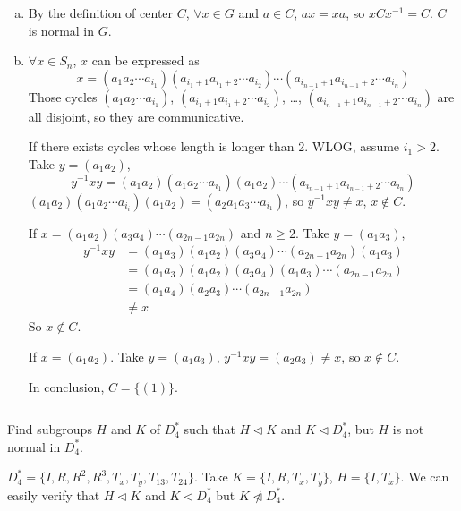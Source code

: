 \begin{answer}
    \begin{enumerate}[(a)]
        \item By the definition of center $C$, $\forall x\in G$ and $a\in C$, $ax=xa$, so $xCx^{-1}=C$. $C$ is normal in $G$.
        \item $\forall x\in S_{n}$, $x$ can be expressed as \[x=(a_{1}a_{2}\cdots a_{i_{1}})(a_{i_{1}+1}a_{i_{1}+2}\cdots a_{i_{2}})\cdots(a_{i_{n-1}+1}a_{i_{n-1}+2}\cdots a_{i_{n}})\]
        Those cycles $(a_{1}a_{2}\cdots a_{i_{1}})$, $(a_{i_{1}+1}a_{i_{1}+2}\cdots a_{i_{2}})$, \dots, $(a_{i_{n-1}+1}a_{i_{n-1}+2}\cdots a_{i_{n}})$ are all disjoint, so they are communicative.

        If there exists cycles whose length is longer than 2. WLOG, assume $i_{1}>2$. Take $y=(a_{1}a_{2})$, \[y^{-1}xy=(a_{1}a_{2})(a_{1}a_{2}\cdots a_{i_{1}})(a_{1}a_{2})\cdots(a_{i_{n-1}+1}a_{i_{n-1}+2}\cdots a_{i_{n}})\] $(a_{1}a_{2})(a_{1}a_{2}\cdots a_{i_{i}})(a_{1}a_{2})=(a_{2}a_{1}a_{3}\cdots a_{i_{1}})$, so $y^{-1}xy\neq x$, $x\notin C$. 

        If $x=(a_{1}a_{2})(a_{3}a_{4})\cdots(a_{2n-1}a_{2n})$ and $n\geq 2$. Take $y=(a_{1}a_{3})$, \[\begin{aligned}
            y^{-1}xy&=(a_{1}a_{3})(a_{1}a_{2})(a_{3}a_{4})\cdots(a_{2n-1}a_{2n})(a_{1}a_{3})\\&=(a_{1}a_{3})(a_{1}a_{2})(a_{3}a_{4})(a_{1}a_{3})\cdots(a_{2n-1}a_{2n})\\&=(a_{1}a_{4})(a_{2}a_{3})\cdots(a_{2n-1}a_{2n})\\&\neq x
        \end{aligned}\] So $x\notin C$.

        If $x=(a_{1}a_{2})$. Take $y=(a_{1}a_{3})$, $y^{-1}xy=(a_{2}a_{3})\neq x$, so $x\notin C$.

        In conclusion, $C=\{(1)\}$.
    \end{enumerate}
\end{answer}

$$ $$

\begin{ex}
    Find subgroups $H$ and $K$ of $D_{4}^{*}$ such that $H\lhd K$ and $K\lhd D_{4}^{*}$, but $H$ is not normal in $D_{4}^{*}$.
\end{ex}

\begin{answer}
    $D_{4}^{*}=\{I,R,R^{2},R^{3},T_{x},T_{y},T_{13},T_{24}\}$. Take $K=\{I, R, T_{x}, T_{y}\}$, $H=\{I, T_{x}\}$. We can easily verify that $H\lhd K$ and $K\lhd  D_{4}^{*}$ but $K\ntriangleleft  D_{4}^{*}$.
\end{answer}

